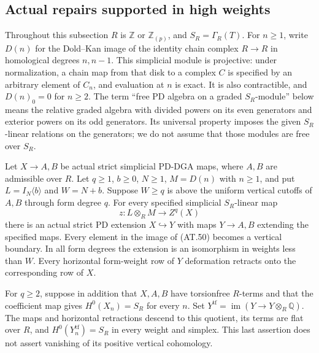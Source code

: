 \subsection{Actual repairs supported in high weights}

Throughout this subsection $R$ is $\mathbb Z$ or
$\mathbb Z_{(p)}$, and $S_R=\Gamma_R(T)$.
For $n\geq1$, write $D(n)$ for the Dold--Kan image of
the identity chain complex $R\to R$ in homological
degrees $n,n-1$.  This simplicial module is projective:
under normalization, a chain map from that disk to a
complex $C$ is specified by an arbitrary element of
$C_n$, and evaluation at $n$ is exact.  It is also
contractible, and $D(n)_0=0$ for $n\geq2$.
The term ``free PD algebra on a graded $S_R$-module''
below means the relative graded algebra with divided
powers on its even generators and exterior powers on
its odd generators.  Its universal property imposes
the given $S_R$-linear relations on the generators;
we do not assume that those modules are free over $S_R$.

\begin{proposition}
\label{AT13}
Let $X\to A,B$ be actual strict simplicial PD-DGA maps,
where $A,B$ are admissible over $R$.  Let $q\geq1$,
$b\geq0$, $N\geq1$, $M=D(n)$ with $n\geq1$, and put
$L=I_N\langle b\rangle$ and $W=N+b$.
Suppose $W\geq q$ is above the uniform vertical
cutoffs of $A,B$ through form degree $q$.
For every specified simplicial $S_R$-linear map
\[
                 z:L\otimes_R M\longrightarrow Z^q(X)
 \tag{AT.50}
\]
there is an actual strict PD extension $X\hookrightarrow Y$
with maps $Y\to A,B$ extending the specified maps.
Every element in the image of \textup{(AT.50)} becomes
a vertical boundary.  In all form degrees the extension
is an isomorphism in weights less than $W$.
Every horizontal form-weight row of $Y$ deformation
retracts onto the corresponding row of $X$.

For $q\geq2$, suppose in addition that $X,A,B$ have
torsionfree $R$-terms and that the coefficient map gives
$H^0(X_n)=S_R$ for every $n$.  Set
$Y^{\mathrm{tf}}=\operatorname{im}(Y\to Y\otimes_R\mathbb Q)$.
The maps and horizontal retractions descend to this
quotient, its terms are flat over $R$, and
$H^0(Y^{\mathrm{tf}}_n)=S_R$ in every weight and simplex.
This last assertion does not assert vanishing of its
positive vertical cohomology.
\end{proposition}

